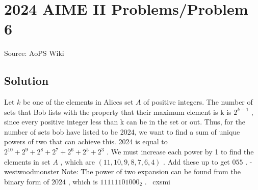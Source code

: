\documentclass[12pt]{article}
\begin{document}
\section*{{2024 AIME II Problems/Problem 6}}
Source: AoPS Wiki

\subsection*{Solution}
Let $k$ be one of the elements in Alices set $A$ of positive integers. The number of sets that Bob lists with the property that their maximum element is k is $2^{k-1}$ , since every positive integer less than k can be in the set or out. Thus, for the number of sets bob have listed to be 2024, we want to find a sum of unique powers of two that can achieve this. 2024 is equal to $2^{10}+2^9+2^8+2^7+2^6+2^5+2^3$ . We must increase each power by 1 to find the elements in set $A$ , which are $(11,10,9,8,7,6,4)$ . Add these up to get $\boxed{055}$ . -westwoodmonster Note: The power of two expansion can be found from the binary form of $2024$ , which is $11111101000_2$ . ~cxsmi
\end{document}
